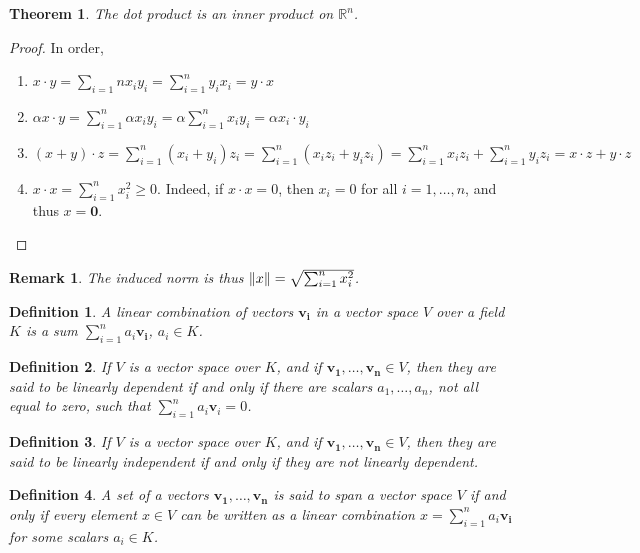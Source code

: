 \documentclass[oneside]{book}
\theoremstyle{mystyle}
\newtheorem{theorem}{Theorem}[section]
\newtheorem{definition}{Definition}[section]
\newtheorem{remark}{Remark}[section]
\DeclarePairedDelimiter\norm{\lVert}{\rVert}
\begin{document}
\begin{theorem}
The dot product is an inner product on $\mathbb{R}^n$.
\end{theorem}
\begin{proof}
In order,
\begin{enumerate}
\item $x\cdot y = \sum_{i=1}{n} x_i y_i = \sum_{i=1}^{n} y_i x_i = y\cdot x$
\item $\alpha x\cdot y = \sum_{i=1}^{n} \alpha x_i y_i = \alpha \sum_{i=1}^{n} x_i y_i = \alpha x_i \cdot y_i$
\item $(x+y)\cdot z = \sum_{i=1}^{n} (x_i+y_i)z_i = \sum_{i=1}^{n} (x_iz_i +y_i z_i)=\sum_{i=1}^{n}x_i z_i+\sum_{i=1}^{n} y_i z_i = x\cdot z + y\cdot z$
\item $x\cdot x = \sum_{i=1}^{n} x_i^2 \geq 0$. Indeed, if $x\cdot x = 0$, then $x_i = 0$ for all $i=1,\hdots, n$, and thus $x=\mathbf{0}$.
\end{enumerate}
\end{proof}

\begin{remark}
The induced norm is thus $\norm{x} = \sqrt{\sum_{i=1}^{n} x_i^2}$.
\end{remark}

\begin{definition}
A linear combination of vectors $\mathbf{v_i}$ in a vector space $V$ over a field $K$ is a sum $\sum_{i=1}^{n} a_i \mathbf{v_i}$, $a_i \in K$.
\end{definition}

\begin{definition}
If $V$ is a vector space over $K$, and if $\mathbf{v_1},\hdots, \mathbf{v_n}\in V$, then they are said to be linearly dependent if and only if there are scalars $a_1,\hdots, a_n$, not all equal to zero, such that $\sum_{i=1}^{n} a_i \mathbf{v}_i = 0$.
\end{definition}

\begin{definition}
If $V$ is a vector space over $K$, and if $\mathbf{v_1},\hdots, \mathbf{v_n}\in V$, then they are said to be linearly independent if and only if they are not linearly dependent.
\end{definition}

\begin{definition}
A set of a vectors $\mathbf{v_1},\hdots, \mathbf{v_n}$ is said to span a vector space $V$ if and only if every element $x\in V$ can be written as a linear combination $x=\sum_{i=1}^{n} a_i \mathbf{v_i}$ for some scalars $a_i \in K$.
\end{definition}
\end{document}
